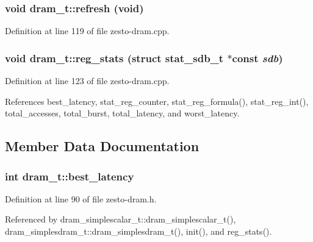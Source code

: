 \subsubsection[{refresh}]{\setlength{\rightskip}{0pt plus 5cm}void dram\_\-t::refresh (void)\hspace{0.3cm}{\tt  [virtual]}}\label{classdram__t_a1b3bdb6bddc7994d1a2e6c42762927a}




Definition at line 119 of file zesto-dram.cpp.
\subsubsection[{reg\_\-stats}]{\setlength{\rightskip}{0pt plus 5cm}void dram\_\-t::reg\_\-stats (struct {\bf stat\_\-sdb\_\-t} $\ast$const  {\em sdb})\hspace{0.3cm}{\tt  [virtual]}}\label{classdram__t_3f583c0e90f4f0661aea0de4abec5d1b}




Definition at line 123 of file zesto-dram.cpp.

References best\_\-latency, stat\_\-reg\_\-counter, stat\_\-reg\_\-formula(), stat\_\-reg\_\-int(), total\_\-accesses, total\_\-burst, total\_\-latency, and worst\_\-latency.

\subsection{Member Data Documentation}
\subsubsection[{best\_\-latency}]{\setlength{\rightskip}{0pt plus 5cm}int {\bf dram\_\-t::best\_\-latency}\hspace{0.3cm}{\tt  [protected]}}\label{classdram__t_65ce6a8937a7e2f29942279cbed89398}




Definition at line 90 of file zesto-dram.h.

Referenced by dram\_\-simplescalar\_\-t::dram\_\-simplescalar\_\-t(), dram\_\-simplesdram\_\-t::dram\_\-simplesdram\_\-t(), init(), and reg\_\-stats().
